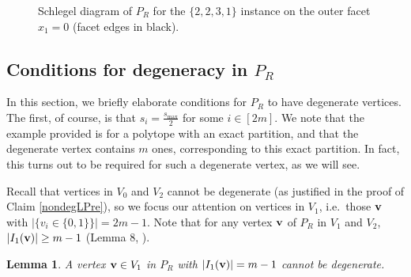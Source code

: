 \documentclass[3p, twocolumn]{elsarticle}
\newtheorem{lemma}[theorem]{Lemma}
\def\ve#1{\mathchoice{\mbox{\boldmath$\displaystyle\bf#1$}}
{\mbox{\boldmath$\textstyle\bf#1$}}
{\mbox{\boldmath$\scriptstyle\bf#1$}}
{\mbox{\boldmath$\scriptscriptstyle\bf#1$}}}
\begin{document}
\begin{figure}[p]


    \caption{Schlegel diagram of $P_R$ for the $\{2,2,3,1\}$ instance on the outer facet $x_1=0$ (facet edges in black).}
    \label{fig:p2_full}
    \vfill
\end{figure}


\subsection{Conditions for degeneracy in $P_R$}
In this section, we briefly elaborate conditions for $P_R$ to have degenerate vertices. 
The first, of course, is that $s_i = \frac{s_{\max}}{2}$ for some $i \in [2m]$.
We note that the example provided is for a polytope with an exact partition, and that the degenerate vertex contains $m$ ones, corresponding to this exact partition. In fact, this turns out to be required for such a degenerate vertex, as we will see.

Recall that vertices in $V_0$ and $V_2$ cannot be degenerate (as justified in the proof of Claim \ref{nondegLPre}), so we focus our attention on vertices in  $V_1$, i.e.~those $\ve{v}$ with $|\{v_i \in \{0,1\}\}| = 2m-1$. Note that for any vertex $\ve{v}$ of $P_R$ in $V_1$ and $V_2$, $|I_1(\ve{v})|\geq m-1$ (Lemma 8, \cite{NS26}). 


\begin{lemma}
    A vertex $\ve{v}\in V_1$ in $P_R$ with $|I_1(\ve{v})| = m-1$ cannot be degenerate. %
\end{lemma}
\end{document}
